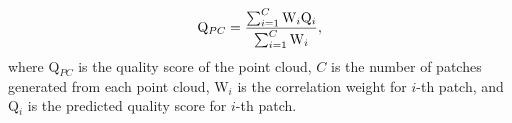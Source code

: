 \documentclass[conference]{IEEEtran}
\begin{document}
\begin{eqnarray}
{\rm Q}_{PC} = \frac{\sum_{i=1}^{C}{{\rm W}_{i}{\rm Q}_{i}}}{\sum_{i=1}^{C}{\rm W}_{i}},
\end{eqnarray}
where Q$_{PC}$ is the quality score of the point cloud, $C$ is the number of patches generated from each point cloud, W$_{i}$ is the correlation weight for $i$-th patch, and Q$_{i}$ is the predicted quality score for $i$-th patch.




\begin{table}[t]
\begin{center}
\caption{Results on WPC database using several NR methods. We report the PLCC, SRCC and RMSE indicators.} 
\label{tab:wpc_contrast}
\end{center}
\end{table}
\end{document}

